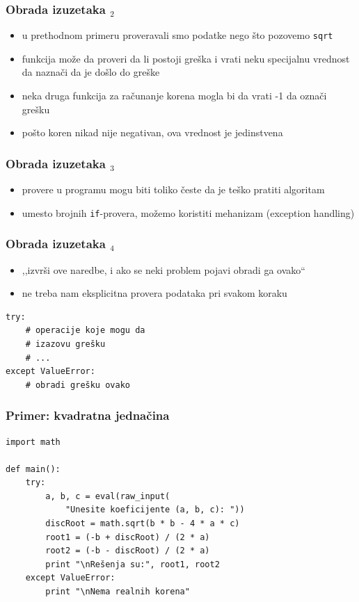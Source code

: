 \documentclass[utf8,compress]{beamer}
\begin{document}
\begin{frame}[fragile]
  \frametitle{Obrada izuzetaka $_2$}
  \begin{itemize}
    \item u prethodnom primeru proveravali smo podatke  nego što pozovemo \texttt{sqrt}
    \item funkcija može da proveri da li postoji greška i vrati neku specijalnu vrednost da naznači da je došlo do greške
    \item neka druga funkcija za računanje korena mogla bi da vrati -1 da označi grešku
    \item pošto koren nikad nije negativan, ova vrednost je jedinstvena
  \end{itemize}
\end{frame}

\begin{frame}[fragile]
  \frametitle{Obrada izuzetaka $_3$}
  \begin{itemize}
    \item provere u programu mogu biti toliko česte da je teško pratiti algoritam
    \item umesto brojnih \texttt{if}-provera, možemo koristiti mehanizam  (exception handling)
  \end{itemize}
\end{frame}

\begin{frame}[fragile]
  \frametitle{Obrada izuzetaka $_4$}
  \begin{itemize}
    \item ,,izvrši ove naredbe, i ako se neki problem pojavi obradi ga ovako``
    \item ne treba nam eksplicitna provera podataka pri svakom koraku
  \end{itemize}
\begin{verbatim}
try:
    # operacije koje mogu da
    # izazovu grešku
    # ...
except ValueError:
    # obradi grešku ovako
\end{verbatim}
\end{frame}

\begin{frame}[fragile]
  \frametitle{Primer: kvadratna jednačina}
\begin{verbatim}
import math

def main():
    try:
        a, b, c = eval(raw_input(
            "Unesite koeficijente (a, b, c): "))
        discRoot = math.sqrt(b * b - 4 * a * c)
        root1 = (-b + discRoot) / (2 * a)
        root2 = (-b - discRoot) / (2 * a)
        print "\nRešenja su:", root1, root2
    except ValueError:
        print "\nNema realnih korena"
\end{verbatim}
\end{frame}
\end{document}
